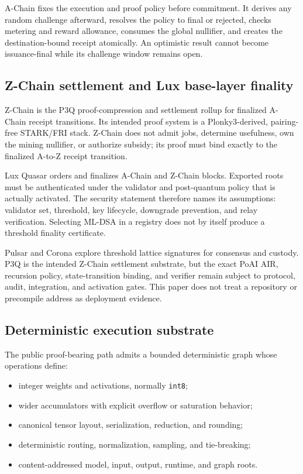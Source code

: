 A-Chain fixes the execution and proof policy before commitment. It derives any
random challenge afterward, resolves the policy to final or rejected, checks
metering and reward allowance, consumes the global nullifier, and creates the
destination-bound receipt atomically. An optimistic result cannot become
issuance-final while its challenge window remains open.

\subsection{Z-Chain settlement and Lux base-layer finality}

Z-Chain is the P3Q proof-compression and settlement rollup for finalized A-Chain
receipt transitions. Its intended proof system is a Plonky3-derived,
pairing-free STARK/FRI stack. Z-Chain does not admit jobs, determine usefulness,
own the mining nullifier, or authorize subsidy; its proof must bind exactly to
the finalized A-to-Z receipt transition.

Lux Quasar orders and finalizes A-Chain and Z-Chain blocks. Exported roots must be
authenticated under the validator and post-quantum policy that is actually
activated. The security statement therefore names its assumptions: validator
set, threshold, key lifecycle, downgrade prevention, and relay verification.
Selecting ML-DSA in a registry does not by itself produce a threshold finality
certificate.

Pulsar and Corona explore threshold lattice signatures for consensus and
custody. P3Q is the intended Z-Chain settlement substrate, but the exact PoAI
AIR, recursion policy, state-transition binding, and verifier remain subject to
protocol, audit, integration, and activation gates. This paper does not treat a
repository or precompile address as deployment evidence.

\subsection{Deterministic execution substrate}

The public proof-bearing path admits a bounded deterministic graph whose
operations define:

\begin{itemize}[leftmargin=1.2em]
  \item integer weights and activations, normally \texttt{int8};
  \item wider accumulators with explicit overflow or saturation behavior;
  \item canonical tensor layout, serialization, reduction, and rounding;
  \item deterministic routing, normalization, sampling, and tie-breaking;
  \item content-addressed model, input, output, runtime, and graph roots.
\end{itemize}

